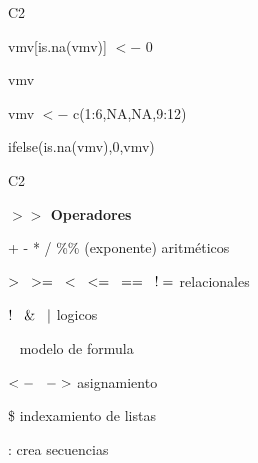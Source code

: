 \documentclass{beamer}
\theoremstyle{definition}
\theoremstyle{remark}
\begin{document}
\begin{frame}{C2}

\hfill

vmv[is.na(vmv)] $<-$ 0

vmv

\hfill


vmv $<-$ c(1:6,NA,NA,9:12)

ifelse(is.na(vmv),0,vmv)

\hfill


\end{frame}


\begin{frame}{C2}

\textbf{$>>$ Operadores}

\hfill

+ \hspace{1mm}   - \hspace{1mm}  * \hspace{1mm}  /  \hspace{1mm}  \%\%  \hspace{1mm} (exponente)   \hspace{4mm} aritm\'eticos

\hfill

$> \hspace{3mm}  >= \hspace{3mm}   < \hspace{3mm}  <=  \hspace{3mm}  ==  \hspace{3mm}  != $ \hspace{4mm}	relacionales

\hfill

$!  \hspace{3mm}  \& \hspace{3mm}   |$	\hspace{4mm} 		logicos

\hfill

~  	 \hspace{4mm} 	modelo de formula

\hfill

$<- \hspace{3mm} ->$    asignamiento

\hfill

\$		indexamiento de listas

\hfill

: \hspace{4mm}	 crea secuencias



\end{frame}
\end{document}
